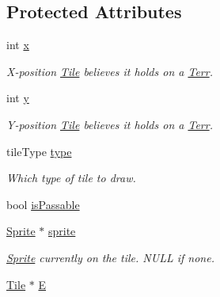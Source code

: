 \subsection*{Protected Attributes}
\begin{DoxyCompactItemize}
\item 
int \hyperlink{class_tile_a47b5eb2072d4b1978923a480043899c9}{x}\hypertarget{class_tile_a47b5eb2072d4b1978923a480043899c9}{}\label{class_tile_a47b5eb2072d4b1978923a480043899c9}

\begin{DoxyCompactList}\small\item\em X-\/position \hyperlink{class_tile}{Tile} believes it holds on a \hyperlink{class_terr}{Terr}. \end{DoxyCompactList}\item 
int \hyperlink{class_tile_a2d87d8813151af6bbd60811964f047a8}{y}\hypertarget{class_tile_a2d87d8813151af6bbd60811964f047a8}{}\label{class_tile_a2d87d8813151af6bbd60811964f047a8}

\begin{DoxyCompactList}\small\item\em Y-\/position \hyperlink{class_tile}{Tile} believes it holds on a \hyperlink{class_terr}{Terr}. \end{DoxyCompactList}\item 
tile\+Type \hyperlink{class_tile_a5aa7ae6350675967edf46400c486a412}{type}\hypertarget{class_tile_a5aa7ae6350675967edf46400c486a412}{}\label{class_tile_a5aa7ae6350675967edf46400c486a412}

\begin{DoxyCompactList}\small\item\em Which type of tile to draw. \end{DoxyCompactList}\item 
bool \hyperlink{class_tile_afa72b458d549b9533f058e2d2fad0f81}{is\+Passable}
\item 
\hyperlink{class_sprite}{Sprite} $\ast$ \hyperlink{class_tile_af768c5b838f49de5d626880c88b3d515}{sprite}\hypertarget{class_tile_af768c5b838f49de5d626880c88b3d515}{}\label{class_tile_af768c5b838f49de5d626880c88b3d515}

\begin{DoxyCompactList}\small\item\em \hyperlink{class_sprite}{Sprite} currently on the tile. N\+U\+LL if none. \end{DoxyCompactList}\item 
\hyperlink{class_tile}{Tile} $\ast$ \hyperlink{class_tile_a0d63c88d4136aecedcb2756d20615b89}{E}\hypertarget{class_tile_a0d63c88d4136aecedcb2756d20615b89}{}\label{class_tile_a0d63c88d4136aecedcb2756d20615b89}


\end{DoxyCompactItemize}
